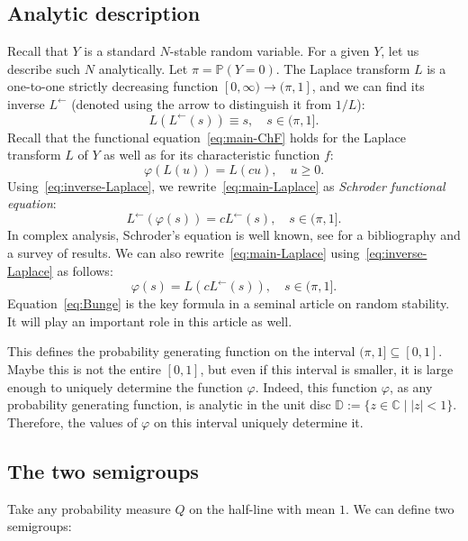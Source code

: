 \documentclass[12pt]{amsart}
\theoremstyle{remark}
\theoremstyle{definition}
\begin{document}
\subsection{Analytic description} Recall that $Y$ is a standard $N$-stable random variable. For a given $Y$, let us describe such $N$ analytically. Let $\pi = \mathbb P(Y = 0)$. The Laplace transform $L$ is a one-to-one strictly decreasing function $[0, \infty) \to (\pi, 1]$, and we can find its inverse $L^{\leftarrow}$ (denoted using the arrow to distinguish it from $1/L$): 
\begin{equation}
\label{eq:inverse-Laplace}
L(L^{\leftarrow}(s)) \equiv s,\quad s \in (\pi, 1].
\end{equation}
Recall that the functional equation~\eqref{eq:main-ChF} holds for the Laplace transform $L$ of $Y$ as well as for its characteristic function $f$:
\begin{equation}
\label{eq:main-Laplace}
\varphi(L(u)) = L(cu),\quad u \ge 0.
\end{equation}
Using~\eqref{eq:inverse-Laplace}, we rewrite~\eqref{eq:main-Laplace} as {\it Schroder functional equation}:
$$
L^{\leftarrow}(\varphi(s)) = cL^{\leftarrow}(s),\quad s \in (\pi, 1]. 
$$
In complex analysis, Schroder's equation is well known, see \cite{Shapiro} for a bibliography and a survey of results. We can also rewrite~\eqref{eq:main-Laplace} using~\eqref{eq:inverse-Laplace} as follows: 
\begin{equation}
\label{eq:Bunge}
\varphi(s) = L(cL^{\leftarrow}(s)),\quad s \in (\pi, 1].
\end{equation}
Equation~\eqref{eq:Bunge} is the key formula in a seminal article \cite{Bunge} on random stability. It will play an important role in this article as well.

This defines the probability generating function on the interval $(\pi, 1] \subseteq [0, 1]$. Maybe this is not the entire $[0, 1]$, but even if this interval is smaller, it is large enough to uniquely determine the function $\varphi$. Indeed, this function $\varphi$, as any probability generating function, is analytic in the unit disc $\mathbb D := \{z \in \mathbb C\mid |z| < 1\}$. Therefore, the values of $\varphi$ on this interval uniquely determine it. 

\subsection{The two semigroups} Take any probability measure $Q$ on the half-line with mean $1$. We can define two semigroups:
\end{document}
